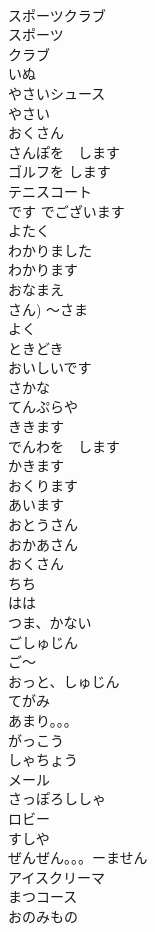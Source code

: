 \documentclass[8pt]{extreport}
\begin{document}
\begin{CJK}{UTF8}{min}
\\	スポーツクラブ		
\\	スポーツ		
\\	クラブ		
\\	いぬ		
\\	やさいシュース		
\\	やさい		
\\	おくさん		
\\	さんぽを　します		
\\	ゴルフを します		
\\	テニスコート		
\\	です	でございます		
\\	よたく		
\\	わかりました		
\\	わかります		
\\	おなまえ		
\\	さん)	〜さま		
\\	よく		
\\	ときどき		
\\	おいしいです		
\\	さかな		
\\	てんぷらや		
\\	ききます	
\\	でんわを　します		
\\	かきます		
\\	おくります		
\\	あいます		
\\	おとうさん		
\\	おかあさん		
\\	おくさん		
\\	ちち		
\\	はは		
\\	つま、かない		
\\	ごしゅじん		
\\	ご〜		
\\	おっと、しゅじん		
\\	てがみ		
\\	あまり。。。		
\\	がっこう		
\\	しゃちょう		
\\	メール		
\\	さっぽろししゃ		
\\	ロビー		
\\	すしや		
\\	ぜんぜん。。。ーません		
\\	アイスクリーマ		
\\	まつコース		
\\	おのみもの		

\end{CJK}
\end{document}
